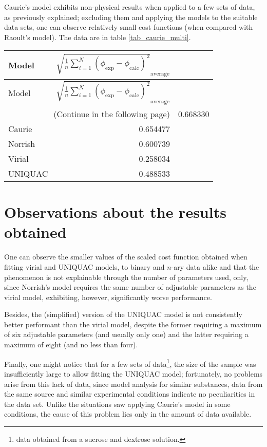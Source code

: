 \documentclass[
	12pt,				%
	openright,
	twoside,
	a4paper,			%
	brazil,			%
	french,				%
	english				%
	]{abntex2}
\begin{document}
Caurie's model exhibits non-physical results when applied to a few sets of data, as
previously explained; excluding them and applying the models to the suitable data
sets, one can observe relatively small cost functions (when compared with Raoult's
model). The data are in table \ref{tab_caurie_multi}.

\begin{tabularx}{\textwidth}{ X  r }
	\caption{Comparison with Caurie's model}
	\label{tab_caurie_multi}\\
	\toprule
	Model & %
		$\sqrt{\frac{1}{n}\sum_{i=1}^N(\phi_{\text{exp}}-%
		\phi_{\text{calc}})^2}_\text{average}$\\
	\midrule
	\endfirsthead
	\toprule
	Model & %
		$\sqrt{\frac{1}{n}\sum_{i=1}^N(\phi_{\text{exp}}-%
		\phi_{\text{calc}})^2}_\text{average}$\\\hline
	\midrule
	\endhead
	\midrule
	\multicolumn{2}{r}{\footnotesize(Continue in the following page)}
	\endfoot
	\endlastfoot
	Raoult & 0.668330 \\
	Caurie & 0.654477 \\
	Norrish & 0.600739 \\
	Virial & 0.258034 \\
	UNIQUAC & 0.488533 \\\hline
\end{tabularx}

\section{Observations about the results obtained}

One can observe the smaller values of the scaled cost function obtained when
fitting virial and UNIQUAC models, to binary and $n$-ary data alike and that the
phenomenon is not explainable through the number of parameters used, only,
since Norrish's model requires the same number of adjustable parameters as the
virial model, exhibiting, however, significantly worse performance.

Besides, the (simplified) version of the UNIQUAC model is not consistently better
performant than the virial model, despite the former requiring a maximum of
six adjustable parameters (and usually only one) and the latter requiring a maximum
of eight (and no less than four).

Finally, one might notice that for a few sets of data\footnote{%
	\cite{norrish1966} data obtained from a sucrose and dextrose solution.
}, the size of the sample was insufficiently large to allow fitting the UNIQUAC
model; fortunately, no problems arise from this lack of data, since model analysis
for similar substances, data from the same source and similar experimental conditions
indicate no peculiarities in the data set. Unlike the situations saw applying
Caurie's model in some conditions, the cause of this problem lies only in the
amount of data available.
\end{document}
